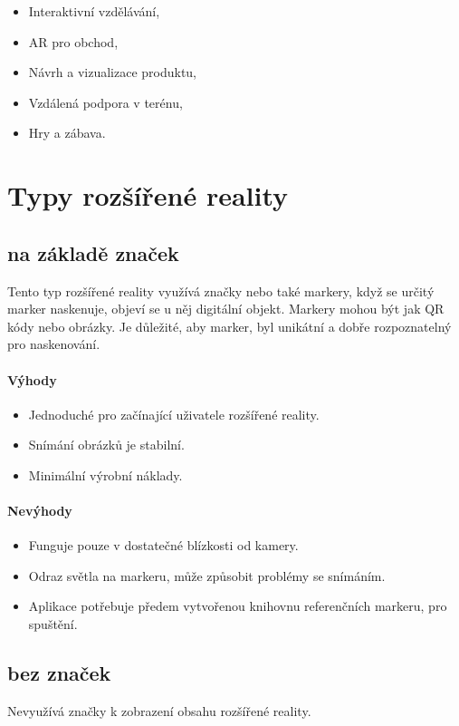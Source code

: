 \documentclass[12pt, a4paper,
twoside,        %
openright
]{report}
\begin{document}
\begin{itemize}
	\item Interaktivní vzdělávání,
	\item AR pro obchod,
	\item Návrh a vizualizace produktu,
	\item Vzdálená podpora v terénu,
	\item Hry a zábava.
\end{itemize}


\section{Typy rozšířené reality}
\label{sec:typy_AR}


\subsection{na základě značek}
Tento typ rozšířené reality využívá značky nebo také markery, když se určitý marker naskenuje, objeví se u něj digitální objekt. Markery mohou být jak QR kódy nebo obrázky.
Je důležité, aby marker, byl unikátní a dobře rozpoznatelný pro naskenování. 

\paragraph{Výhody}
\begin{itemize}
	\item Jednoduché pro začínající uživatele rozšířené reality.
	\item Snímání obrázků je stabilní. 
	\item Minimální výrobní náklady.
\end{itemize}

\paragraph{Nevýhody}
\begin{itemize}
	\item Funguje pouze v dostatečné blízkosti od kamery.
	\item Odraz světla na markeru, může způsobit problémy se snímáním.
	\item Aplikace potřebuje předem vytvořenou knihovnu referenčních markeru, pro spuštění.
\end{itemize}

\subsection{bez značek}
Nevyužívá značky k zobrazení obsahu rozšířené reality.
\end{document}
